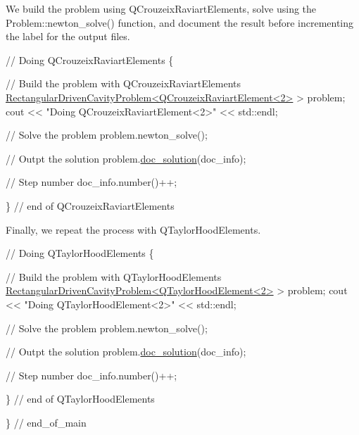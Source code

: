 We build the problem using {\ttfamily Q\+Crouzeix\+Raviart\+Elements}, solve using the {\ttfamily Problem\+::newton\+\_\+solve()} function, and document the result before incrementing the label for the output files.


\begin{DoxyCodeInclude}
 \textcolor{comment}{// Doing QCrouzeixRaviartElements}
 \{
  
  \textcolor{comment}{// Build the problem with QCrouzeixRaviartElements}
  \hyperlink{classRectangularDrivenCavityProblem}{RectangularDrivenCavityProblem<QCrouzeixRaviartElement<2>}
       > problem;
  cout << \textcolor{stringliteral}{"Doing QCrouzeixRaviartElement<2>"} << std::endl;
  
  \textcolor{comment}{// Solve the problem}
  problem.newton\_solve();
  
  \textcolor{comment}{// Outpt the solution}
  problem.\hyperlink{classRectangularDrivenCavityProblem_ab9540b4f539b7d62a1165cc42b4190ea}{doc\_solution}(doc\_info);

  \textcolor{comment}{// Step number}
  doc\_info.number()++;

 \} \textcolor{comment}{// end of QCrouzeixRaviartElements}

\end{DoxyCodeInclude}


Finally, we repeat the process with {\ttfamily Q\+Taylor\+Hood\+Elements}.


\begin{DoxyCodeInclude}
 \textcolor{comment}{// Doing QTaylorHoodElements}
 \{
  
  \textcolor{comment}{// Build the problem with QTaylorHoodElements}
  \hyperlink{classRectangularDrivenCavityProblem}{RectangularDrivenCavityProblem<QTaylorHoodElement<2>} 
      > problem;
  cout << \textcolor{stringliteral}{"Doing QTaylorHoodElement<2>"} << std::endl;
  
  \textcolor{comment}{// Solve the problem}
  problem.newton\_solve();
  
  \textcolor{comment}{// Outpt the solution}
  problem.\hyperlink{classRectangularDrivenCavityProblem_ab9540b4f539b7d62a1165cc42b4190ea}{doc\_solution}(doc\_info);

  \textcolor{comment}{// Step number}
  doc\_info.number()++;

 \} \textcolor{comment}{// end of QTaylorHoodElements}


\} \textcolor{comment}{// end\_of\_main}

\end{DoxyCodeInclude}




